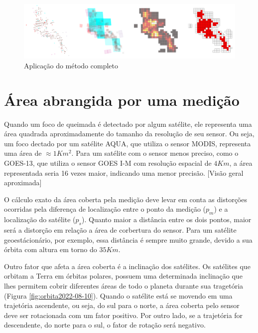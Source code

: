 \documentclass[cic,tc]{iiufrgs}
\begin{document}
\begin{figure}[H]
    \caption{Aplicação do método completo}
    \begin{center}
        \includegraphics[width=35em]{exemplo_metodo_completo}
    \end{center}
    \label{fig:exemplo_metodo_completo}
\end{figure}

\section{Área abrangida por uma medição}

Quando um foco de queimada é detectado por algum satélite, ele representa uma área quadrada aproximadamente do tamanho da resolução de seu sensor. Ou seja, um foco dectado por um satélite AQUA, que utiliza o sensor MODIS, representa uma área de $\approx1Km^2$. Para um satélite com o sensor menos preciso, como o GOES-13, que utiliza o sensor GOES I-M com resolução espacial de $4Km$, a área representada seria 16 vezes maior, indicando uma menor precisão. [Visão geral aproximada] \par

O cálculo exato da área coberta pela medição deve levar em conta as distorções ocorridas pela diferença de localização entre o ponto da medição ($p_m$) e a localização  do satélite ($p_s$). Quanto maior a distância entre os dois pontos, maior será a distorção em relação a área de corbertura do sensor. Para um satélite geoestácionário, por exemplo, essa distância é sempre muito grande, devido a sua órbita com altura em torno do $35Km$. \par

Outro fator que afeta a área coberta é a inclinação dos satélites. Os satélites que orbitam a Terra em órbitas polares, possuem uma determinada inclinação que lhes permitem cobrir diferentes áreas de todo o planeta durante sua tragetória (Figura \ref{fig:orbita2022-08-10}). Quando o satélite está se movendo em uma trajetória ascendente, ou seja, do sul para o norte, a área coberta pelo sensor deve ser rotacionada com um fator positivo. Por outro lado, se a trajetória for descendente, do norte para o sul, o fator de rotação será negativo. \par
\end{document}
